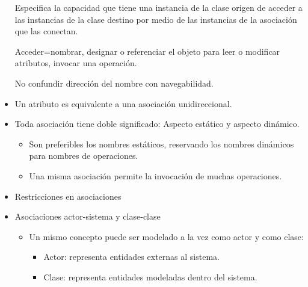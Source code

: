 \documentclass[12pt, twoside, openright]{report} %
\begin{document}
\begin{itemize}
      Especifica la capacidad que tiene una instancia de la clase origen
      de acceder a las instancias de la clase destino por medio de las
      instancias de la asociación que las conectan.

      Acceder=nombrar, designar o referenciar el objeto para leer o
      modificar atributos, invocar una operación.

      No confundir dirección del nombre con navegabilidad.

    \item
      Un atributo es equivalente a una asociación unidireccional.
    \item
      Toda asociación tiene doble significado: Aspecto estático y
      aspecto dinámico.

      \begin{itemize}
      
      \item
        Son preferibles los nombres estáticos, reservando los nombres
        dinámicos para nombres de operaciones.
      \item
        Una misma asociación permite la invocación de muchas
        operaciones.
      \end{itemize}
    \item
      Restricciones en asociaciones
	  \begin{figure}[H]
		{\def\svgwidth{.75\textwidth}
		}
	\end{figure}
    \item
      Asociaciones actor-sistema y clase-clase

      \begin{itemize}
      
      \item
        Un mismo concepto puede ser modelado a la vez como actor y como
        clase:

        \begin{itemize}
        
        \item
          Actor: representa entidades externas al sistema.
        \item
          Clase: representa entidades modeladas dentro del sistema.
        \end{itemize}
      \end{itemize}
    \end{itemize}
\end{document}
